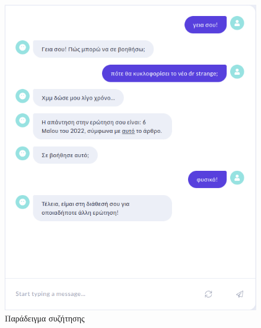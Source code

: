 \begin{figure}[!ht]
\centering
\begin{minipage}{0.5\textwidth}
  \captionsetup{justification=centering}
  \includegraphics[width=1\textwidth]{images/chapter4/rasa-x-example-1.png}
\noindent
\caption{Παράδειγμα συζήτησης}
\label{fig:example-1}
\end{minipage}%
\begin{minipage}{0.5\textwidth}
  \captionsetup{justification=centering}

\end{minipage}
\end{figure}
